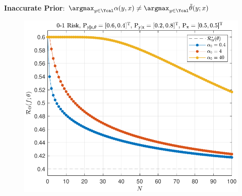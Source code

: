 \documentclass[aspectratio=169,usenames,dvipsnames]{beamer}
\begin{document}
\begin{frame}
\begin{columns}[c]
\begin{column}{0.5\linewidth}
\centering
\textbf{Inaccurate Prior}: $\argmax_{y \in \Ycal} \alpha(y,x) \neq \argmax_{y \in \Ycal} \tilde{\theta}(y;x)$
%
\begin{figure}
\centering
\includegraphics[width=0.9\linewidth]{Risk_cond_01_Dir_N_leg_a0__subj_bad.pdf}
\end{figure}

\end{column}

\end{columns}

\centering
{}

\end{frame}
\end{document}
